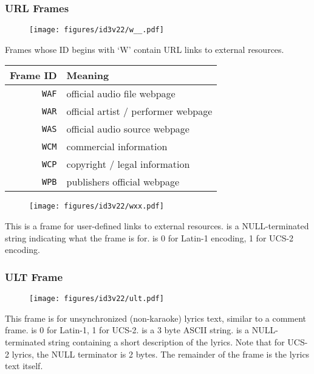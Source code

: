 \clearpage

\subsubsection{URL Frames}
\begin{figure}[h]
  \texttt{[image: figures/id3v22/w\_\_.pdf]}
\end{figure}
\par
\noindent
Frames whose ID begins with `W' contain URL links to external resources.
\par
\begin{table}[h]
  \begin{tabular}{|r|l|}
    \hline
    Frame ID & Meaning \\
    \hline
    \texttt{WAF} & official audio file webpage \\
    \texttt{WAR} & official artist / performer webpage \\
    \texttt{WAS} & official audio source webpage \\
    \texttt{WCM} & commercial information \\
    \texttt{WCP} & copyright / legal information \\
    \texttt{WPB} & publishers official webpage \\
    \hline
  \end{tabular}
\end{table}
\begin{figure}[h]
  \texttt{[image: figures/id3v22/wxx.pdf]}
\end{figure}
\par
\noindent
This is a frame for user-defined links to external resources.
 is a NULL-terminated string indicating
what the frame is for.
 is 0 for Latin-1 encoding, 1 for UCS-2 encoding.

\clearpage

\subsubsection{ULT Frame}
\begin{figure}[h]
\texttt{[image: figures/id3v22/ult.pdf]}
\end{figure}
\par
\noindent
This frame is for unsynchronized (non-karaoke) lyrics text,
similar to a comment frame.
 is 0 for Latin-1, 1 for UCS-2.
 is a 3 byte ASCII string.
 is a NULL-terminated string
containing a short description of the lyrics.
Note that for UCS-2 lyrics, the NULL terminator is 2 bytes.
The remainder of the frame is the lyrics text itself.


